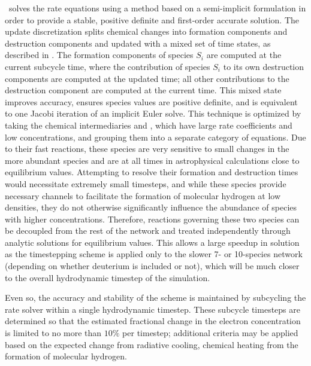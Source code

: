 \enzo\ solves the rate equations using a method based on a semi-implicit
formulation in order to provide a stable, positive definite and first-order
accurate solution.  The update discretization splits chemical changes into
formation components and destruction components and updated with a mixed set of
time states, as described in \citet{anninos97}.  The formation components of
species $S_i$ are computed at the current subcycle time, where the contribution
of species $S_i$ to its own destruction components are computed at the updated
time; all other contributions to the destruction component are computed at the
current time.  This mixed state improves accuracy, ensures species values
are positive definite, and is equivalent to one Jacobi iteration of an implicit
Euler solve.  This technique is optimized by taking the chemical intermediaries
\Hm and \HHp, which have large rate coefficients and low concentrations, and
grouping them into a separate category of equations.  Due to their fast
reactions, these species are very sensitive to small changes in the more
abundant species and are at all times in astrophysical calculations close to
equilibrium values.  Attempting to resolve their formation and destruction
times would necessitate extremely small timesteps, and while these species
provide necessary channels to facilitate the formation of molecular hydrogen at
low densities, they do not otherwise significantly influence the abundance of
species with higher concentrations.  Therefore, reactions governing these two
species can be decoupled from the rest of the network and treated independently
through analytic solutions for equilibrium values.  This allows a large speedup
in solution as the timestepping scheme is applied only to the slower 7- or
10-species network (depending on whether deuterium is included or not), which
will be much closer to the overall hydrodynamic timestep of the simulation.

Even so, the accuracy and stability of the scheme is maintained by subcycling
the rate solver within a single hydrodynamic timestep.  These subcycle
timesteps are determined so that the estimated fractional change in the
electron concentration is limited to no more than $10\%$ per timestep;
additional criteria may be applied based on the expected change from radiative
cooling, chemical heating from the formation of molecular hydrogen.

